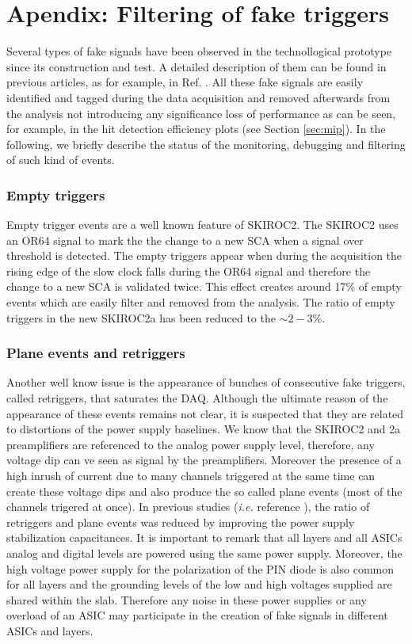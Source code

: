 \documentclass[a4paper,11pt]{article}
\begin{document}
\appendix
\section{Apendix: Filtering of fake triggers}
\label{sec:retriggers}

Several types of fake signals have been observed in the technollogical prototype since its construction and test. A detailed description of them
can be found in previous articles, as for example, in Ref. \cite{Amjad:2014tha}. All these fake signals are easily identified
and tagged during the data acquisition and removed afterwards from the analysis
not introducing any significance loss of performance as can be seen, for example, in the hit detection efficiency plots (see Section \ref{sec:mip}).
In the following, we briefly describe the status of the monitoring, debugging and filtering
of such kind of events.

\subsubsection*{Empty triggers}

Empty trigger events are a well known feature of SKIROC2. The SKIROC2 uses
an OR64 signal to mark the the change to a new SCA when a signal over threshold is
detected. The empty triggers appear when during
the acquisition the rising edge of the slow clock falls during the OR64 signal
and therefore the change to a new SCA is validated twice.
This effect creates around 17\% of empty events which are easily filter and removed from the
analysis. The ratio of empty triggers in the new SKIROC2a has been reduced to the $\sim2-3\%$.

\subsubsection*{Plane events and retriggers}

Another well know issue is the appearance of bunches of consecutive fake triggers, called retriggers,
that saturates the DAQ. 
Although the ultimate reason of the appearance of these events remains not clear, it
is suspected that they are related to distortions of the
power supply baselines. We know that the SKIROC2 and 2a preamplifiers are referenced to the analog power supply level,
therefore, any voltage dip can ve seen as signal by the preamplifiers.
Moreover the presence of a high inrush of current
due to many channels triggered at the same time can create these voltage dips
and also produce the so called plane events (most of the channels trigered at once).
In previous studies ({\it i.e.} reference \cite{Amjad:2014tha}), the ratio of retriggers and plane events
was reduced by improving the power supply stabilization capacitances. It is important to remark that
all layers and all ASICs analog and digital levels are powered using the same power supply.
Moreover, the high voltage power supply for the polarization of the PIN diode is also common for all layers
and the grounding levels of the low and high voltages supplied are shared within the slab.
Therefore any noise in
these power supplies or any overload of an ASIC may participate in the creation of fake signals
in different ASICs and layers.
\end{document}
